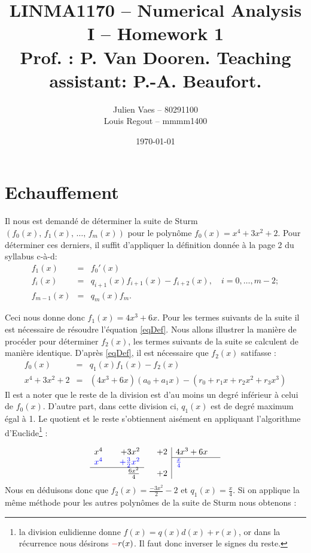 \documentclass[11pt]{article}
\title{LINMA1170 -- Numerical Analysis I -- Homework 1\\ \normalsize{Prof. : P. Van Dooren. Teaching assistant: P.-A. Beaufort.}\\ }
\author{Julien Vaes -- 80291100 \\ Louis Regout -- mmmm1400}
\date{\today}
\begin{document}
\maketitle


\section*{Echauffement}
Il nous est demandé de déterminer la suite de Sturm  $(f_0(x), \, f_1(x),\, \dots, \, f_m(x))$
pour le polynôme $f_0(x) = x^4 + 3x^2 +2$.
Pour déterminer ces derniers, il suffit d'appliquer la définition donnée à
la page 2 du syllabus c-à-d:
\begin{eqnarray}
  f_1(x) &=& f_0'(x)\\
  f_i(x) &=& q_{i+1}(x)f_{i+1}(x)-f_{i+2}(x), \quad i = 0, \dots, m-2; \label{eqDef} \\
  f_{m-1}(x)&=&q_{m}(x)f_{m}.
\end{eqnarray}

Ceci nous donne donc $f_{1}(x) = 4x^3 + 6x$. Pour les termes suivants de la suite il est nécessaire de
résoudre l'équation \ref{eqDef}. Nous allons illustrer la manière de procéder pour déterminer $f_{2}(x)$, les termes suivants de la suite
se calculent de manière identique. D'après \ref{eqDef}, il est nécessaire que $f_{2}(x)$ satifasse :
\begin{eqnarray}
   f_{0}(x)&=&q_{1}(x)f_{1}(x)-f_{2}(x)\\
   x^4 + 3x^2 +2 &=& (4x^3 + 6x)(a_0 + a_1x) - (r_0+r_1x+r_2x^2+r_3x^3) \label{initSyst}
\end{eqnarray}
Il est a noter que le reste de la division est d'au moins un degré inférieur à celui de $f_{0}(x)$. D'autre part, dans cette division ci, $q_1 (x)$
est de degré maximum égal à 1. Le quotient et le reste s'obtiennent aisément en appliquant l'algorithme d'Euclide\footnote{la division eulidienne donne $f (x) = q (x) d (x) + r (x)$,
or dans la récurrence nous désirons ${\color{red}-}r (x)$. Il faut donc inverser le signes du reste.} :

$$
\begin{array}{rrrrr|ll}
 x^4&&+3x^2&&+2 &4x^3+6x  &  \\
\cline{6-7}
 \color{blue}{x^4}&& \color{blue}{+\frac{3}{2}x^2}&& & \color{blue}{\frac{x}{4}} &   \\
\cline{1-3}
&&\frac{6x^2}{4}&&+2&&
\end{array}
$$
Nous en déduisons donc que $f_{2}(x)=\frac{-3x^2}{2}-2$ et $q_{1}(x)=\frac{x}{4}$. Si on applique la même méthode pour les autres polynômes
de la suite de Sturm nous obtenons :
\end{document}
